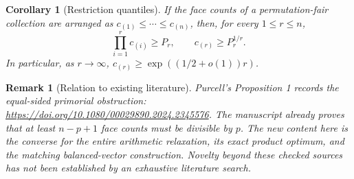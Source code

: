 \documentclass[11pt]{article}
\newtheorem{corollary}[theorem]{Corollary}
\newtheorem{remark}[theorem]{Remark}
\begin{document}
\begin{corollary}[Restriction quantiles]
If the face counts of a permutation-fair collection are arranged as
$c_{(1)}\le\cdots\le c_{(n)}$, then, for every $1\le r\le n$,
\[
 \prod_{i=1}^r c_{(i)}\ge P_r,
 \qquad c_{(r)}\ge P_r^{1/r}.
\]
In particular, as $r\to\infty$, $c_{(r)}\ge\exp((1/2+o(1))r)$.
\end{corollary}

\begin{remark}[Relation to existing literature]
Purcell's Proposition 1 records the equal-sided primorial obstruction:
\url{https://doi.org/10.1080/00029890.2024.2345576}.
The manuscript already proves that at least $n-p+1$ face counts must be
divisible by $p$. The new content here is the converse for the entire
arithmetic relaxation, its exact product optimum, and the matching
balanced-vector construction. Novelty beyond these checked sources has
not been established by an exhaustive literature search.
\end{remark}
\end{document}
